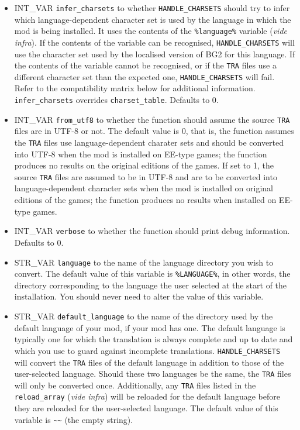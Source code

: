 \documentclass{article}
\def\t#1{{\tt #1}}
\begin{document}
\begin{itemize}
\item INT_VAR \verb+infer_charsets+ to whether \verb+HANDLE_CHARSETS+ should try to infer which language-dependent character set is used by the language in which the mod is being installed. It uses the contents of the \t{\%language\%} variable (\textit{vide infra}). If the contents of the variable can be recognised, \verb+HANDLE_CHARSETS+ will use the character set used by the localised version of BG2 for this language. If the contents of the variable cannot be recognised, or if the \t{TRA} files use a different character set than the expected one, \verb+HANDLE_CHARSETS+ will fail. Refer to the compatibility matrix below for additional information. \verb+infer_charsets+ overrides \verb+charset_table+. Defaults to 0.
\item INT_VAR \verb+from_utf8+ to whether the function should assume the source \t{TRA} files are in UTF-8 or not. The default value is 0, that is, the function assumes the \t{TRA} files use language-dependent charater sets and should be converted into UTF-8 when the mod is installed on EE-type games; the function produces no results on the original editions of the games. If set to 1, the source \t{TRA} files are assumed to be in UTF-8 and are to be converted into language-dependent character sets when the mod is installed on original editions of the games; the function produces no results when installed on EE-type games.
\item INT_VAR \verb+verbose+ to whether the function should print debug information. Defaults to 0.
\item STR_VAR \verb+language+ to the name of the language directory you wish to convert. The default value of this variable is \t{\%LANGUAGE\%}, in other words, the directory corresponding to the language the user selected at the start of the installation. You should never need to alter the value of this variable.
\item STR_VAR \verb+default_language+ to the name of the directory used by the default language of your mod, if your mod has one. The default language is typically one for which the translation is always complete and up to date and which you use to guard against incomplete translations. \verb+HANDLE_CHARSETS+ will convert the \t{TRA} files of the default language in addition to those of the user-selected language. Should these two languages be the same, the \t{TRA} files will only be converted once. Additionally, any \t{TRA} files listed in the \verb+reload_array+ (\textit{vide infra}) will be reloaded for the default language before they are reloaded for the user-selected language. The default value of this variable is \verb+~~+ (the empty string).

\end{itemize}
\end{document}
